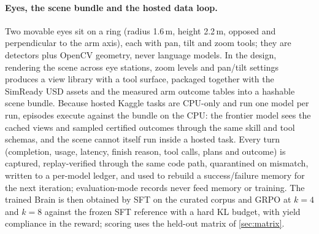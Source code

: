 \paragraph{Eyes, the scene bundle and the hosted data loop.}
Two movable eyes sit on a ring (radius 1.6\,m, height 2.2\,m, opposed and perpendicular to the arm axis), each with pan, tilt and zoom tools; they are detectors plus OpenCV geometry, never language models.
In the design, rendering the scene across eye stations, zoom levels and pan/tilt settings produces a view library with a tool surface, packaged together with the SimReady USD assets and the measured arm outcome tables into a hashable scene bundle.
Because hosted Kaggle tasks are CPU-only and run one model per run, episodes execute against the bundle on the CPU: the frontier model sees the cached views and sampled certified outcomes through the same skill and tool schemas, and the scene cannot itself run inside a hosted task.
Every turn (completion, usage, latency, finish reason, tool calls, plans and outcome) is captured, replay-verified through the same code path, quarantined on mismatch, written to a per-model ledger, and used to rebuild a success/failure memory for the next iteration; evaluation-mode records never feed memory or training.
The trained Brain is then obtained by SFT on the curated corpus and GRPO at $k=4$ and $k=8$ against the frozen SFT reference with a hard KL budget, with yield compliance in the reward; scoring uses the held-out matrix of \cref{sec:matrix}.

